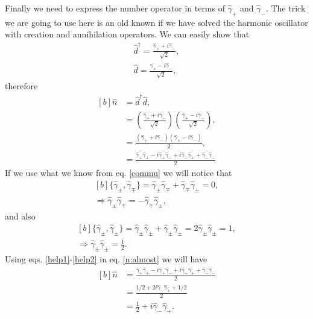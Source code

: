 \begin{questions}
\begin{solution}
  Finally we need to express the number operator in terms of $\hat{\gamma}_+$ and $\hat{\gamma}_-$. The trick we are going to use here is an old known if we have solved the harmonic oscillator with creation and annihilation operators. We can easily show that
  \begin{eqnarray}
    \hat{d}^\dagger = \frac{\hat{\gamma}_+ + i\hat{\gamma}_-}{\sqrt{2}},\\
    \hat{d} = \frac{\hat{\gamma}_+ - i\hat{\gamma}_-}{\sqrt{2}},
  \end{eqnarray}
  therefore
  \begin{equation}
    \begin{aligned}[b]
      \hat{n} &= \hat{d}^\dagger \hat{d},\\
      &= \left(\frac{\hat{\gamma}_+ + i\hat{\gamma}_-}{\sqrt{2}}\right)\left(\frac{\hat{\gamma}_+ - i\hat{\gamma}_-}{\sqrt{2}}\right),\\
      &= \frac{(\hat{\gamma}_+ + i\hat{\gamma}_-)(\hat{\gamma}_+ - i\hat{\gamma}_-)}{2},\\
      &= \frac{\hat{\gamma}_+\hat{\gamma}_+ - i\hat{\gamma}_+\hat{\gamma}_- + i\hat{\gamma}_- \hat{\gamma}_+ + \hat{\gamma}_-\hat{\gamma}_-}{2}
      \label{n:almost}
    \end{aligned}
  \end{equation}
  If we use what we know from eq. \ref{commu} we will notice that
  \begin{equation}
    \begin{aligned}[b]
      \{\hat{\gamma}_\pm,\hat{\gamma}_\mp \} = \hat{\gamma}_\pm\hat{\gamma}_\mp+ \hat{\gamma}_\mp\hat{\gamma}_\pm = 0,\\
      \Rightarrow \hat{\gamma}_\pm\hat{\gamma}_\mp = - \hat{\gamma}_\mp\hat{\gamma}_\pm,
      \label{help1}
    \end{aligned}
  \end{equation}
  and also
  \begin{equation}
    \begin{aligned}[b]
      \{\hat{\gamma}_\pm,\hat{\gamma}_\pm \} = \hat{\gamma}_\pm\hat{\gamma}_\pm+ \hat{\gamma}_\pm\hat{\gamma}_\pm = 2 \hat{\gamma}_\pm\hat{\gamma}_\pm = 1,\\
      \Rightarrow \hat{\gamma}_\pm\hat{\gamma}_\pm = \frac{1}{2}.
      \label{help2}
    \end{aligned}
  \end{equation}
  Using eqs. \ref{help1}-\ref{help2} in eq. \ref{n:almost} we will have
  \begin{equation}
    \begin{aligned}[b]
      \hat{n} &= \frac{\hat{\gamma}_+\hat{\gamma}_+ - i\hat{\gamma}_+\hat{\gamma}_- + i\hat{\gamma}_- \hat{\gamma}_+ + \hat{\gamma}_-\hat{\gamma}_-}{2}\\
      &=\frac{1/2 + 2i\hat{\gamma}_- \hat{\gamma}_+ + 1/2}{2}\\
      &=\frac{1}{2} + i\hat{\gamma}_- \hat{\gamma}_+.
      \label{n:almost}
    \end{aligned}
  \end{equation}
\end{solution}
\end{questions}


%
%
